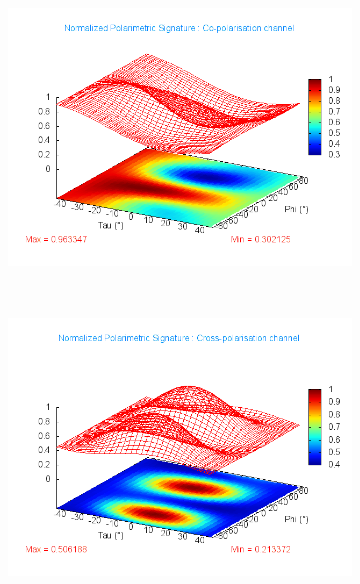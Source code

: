 \begin{figure}[tp]
	\centering
	\begin{subfigure}[b]{0.45\textwidth}
			\includegraphics[width=\textwidth]{Figures/Extra/Signature/C/XpolSignature_50_630}
			\label{fig:a568767}
			\caption{}
	\end{subfigure}
    ~
	\begin{subfigure}[b]{0.45\textwidth}
		\includegraphics[width=\textwidth]{Figures/Extra/Signature/C/CopolSignature_50_630}
		\label{fig:a568723}
		\caption{}
	\end{subfigure}
	~
	\begin{subfigure}[b]{0.45\textwidth}

\end{subfigure}
\end{figure}
